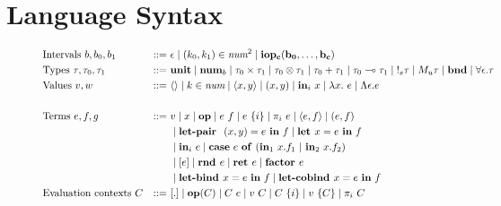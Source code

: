 \section{Language Syntax}

\begin{figure}[tbp]
  \begin{alignat*}{3}
         &\text{Intervals } b, b_0, b_1 &::=~ &\epsilon
         \mid (k_0, k_1) \in \textit{num}^{2}
         \mid \mathbf{iop_c(b_0, \ldots, b_c)} \\
         &\text{Types } \tau, \tau_0, \tau_1 &::=~ &\mathbf{unit}
         \mid \num_{b}
         \mid \tau_0 \times \tau_1
         \mid \tau_0 \otimes \tau_1
         \mid \tau_0 + \tau_1
         \mid \tau_0 \multimap \tau_1
         \mid {\bang{s} \tau}
         \mid {M_u \tau}
         \mid \textbf{bnd}
         \mid \forall \epsilon . \tau
         \\
         &\text{Values } v, w \ &::=~ &\langle \rangle
         \mid k \in \textit{num}
         \mid \langle x,y \rangle 
         \mid (x, y)
         \mid \tin_i \ x
         \mid \lambda x.~e
         \mid \Lambda \epsilon . e \\
         \\
         &\text{Terms } e, f, g &::=~ &v
         \mid x
         \mid \mathbf{op}
         \mid e~f
         \mid e~\{i\}
         \mid {\pi}_i\ e
         \mid \langle e,f \rangle 
         \mid (e, f) \\
         & & & \mid \letpair \ (x,y) = e \ \tin \ f
         \mid \letassign x  = e \ \tin \ f \\
         & & & \mid \tin_i \ e
         \mid 
          \mathbf{case} \ e \ \mathbf{of} \ (\tin_1 \ x.f_1 \ | \ \tin_2 \ x.f_2) \\
         & & &
         \mid [e]
         \mid \rnd e
         \mid {\ret e} 
         \mid \factor e \\
         & & & 
         \mid {\letbind x = e \ \tin \ f}
         \mid \letcobind x = e \ \tin \ f
         \\
         &\text{Evaluation contexts } C &::=~ &[.] 
         \mid \mathbf{op}(C) 
         \mid C~e 
         \mid v~C 
         \mid C~\{i\}
         \mid v~\{C\}
         \mid \pi_i~C \\
         & & &

\end{alignat*}
\end{figure}
